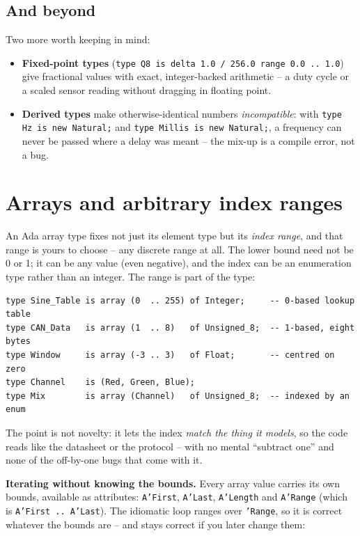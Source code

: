 \subsection{And beyond}

Two more worth keeping in mind:
\begin{itemize}
  \item \textbf{Fixed-point types} (\texttt{type Q8 is delta 1.0 / 256.0 range
        0.0 .. 1.0}) give fractional values with exact, integer-backed arithmetic
        -- a duty cycle or a scaled sensor reading without dragging in floating
        point.
  \item \textbf{Derived types} make otherwise-identical numbers
        \emph{incompatible}: with \texttt{type Hz is new Natural;} and
        \texttt{type Millis is new Natural;}, a frequency can never be passed
        where a delay was meant -- the mix-up is a compile error, not a bug.
\end{itemize}

\section{Arrays and arbitrary index ranges}
\label{sec:arrays}

An Ada array type fixes not just its element type but its \emph{index range}, and
that range is yours to choose -- any discrete range at all. The lower bound need
not be 0 or 1; it can be any value (even negative), and the index can be an
enumeration type rather than an integer. The range is part of the type:

\begin{lstlisting}
type Sine_Table is array (0  .. 255) of Integer;     -- 0-based lookup table
type CAN_Data   is array (1  .. 8)   of Unsigned_8;  -- 1-based, eight bytes
type Window     is array (-3 .. 3)   of Float;       -- centred on zero
type Channel    is (Red, Green, Blue);
type Mix        is array (Channel)   of Unsigned_8;  -- indexed by an enum
\end{lstlisting}

The point is not novelty: it lets the index \emph{match the thing it models}, so
the code reads like the datasheet or the protocol -- with no mental ``subtract
one'' and none of the off-by-one bugs that come with it.

\textbf{Iterating without knowing the bounds.} Every array value carries its own
bounds, available as attributes: \texttt{A'First}, \texttt{A'Last},
\texttt{A'Length} and \texttt{A'Range} (which is \texttt{A'First\,..\,A'Last}). The
idiomatic loop ranges over \texttt{'Range}, so it is correct whatever the bounds
are -- and stays correct if you later change them:


